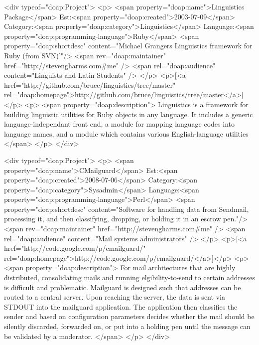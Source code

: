 \documentclass[]{article}
\begin{document}
  <div typeof="doap:Project">
		<p>
			<span property="doap:name">Linguistics Package</span> Est:<span property="doap:created">2003-07-09</span> 
			Category:<span property="doap:category">Linguistics</span>  Language:<span property="doap:programming-language">Ruby</span>
			<span property="doap:shortdesc" content="Michael Grangers Linguistics framework for Ruby (from SVN)'"/>
			<span rev="doap:maintainer" href="http://stevengharms.com#me" />
			<span rel="doap:audience" content="Linguists and Latin Students" />
		</p>
		<p>[<a href="http://github.com/bruce/linguistics/tree/master" rel="doap:homepage">http://github.com/bruce/linguistics/tree/master</a>]</p>
		<p>
			<span property="doap:description">
				Linguistics is a framework for building linguistic utilities for Ruby objects
in any language. It includes a generic language-independant front end, a
module for mapping language codes into language names, and a module which
contains various English-language utilities
			</span>
		</p>	
</div>




  <div typeof="doap:Project">
		<p>
			<span property="doap:name">CMailguard</span> Est:<span property="doap:created">2008-07-06</span> 
			Category:<span property="doap:category">Sysadmin</span>  Language:<span property="doap:programming-language">Perl</span>
			<span property="doap:shortdesc" content="Software for handling data from Sendmail, processing it, and then classifying, dropping, or holding it in an escrow pen."/>
			<span rev="doap:maintainer" href="http://stevengharms.com#me" />
			<span rel="doap:audience" content="Mail systems administrators" />
		</p>
		<p>[<a href="http://code.google.com/p/cmailguard/" rel="doap:homepage">http://code.google.com/p/cmailguard/</a>]</p>
		<p>
			<span property="doap:description">
				For mail architectures that are highly distributed, consolidating mails and running elgibility-to-send to certain addresses is difficult and problematic.  Mailguard is designed such that addresses can be routed to a central server. Upon reaching the server, the data is sent via STDOUT into the mailguard application.  The application then classifies the sender and based on configuration parameters decides whether the mail should be silently discarded, forwarded on, or put into a holding pen until the message can be validated by a moderator.
			</span>
		</p>	
</div>
\end{document}

